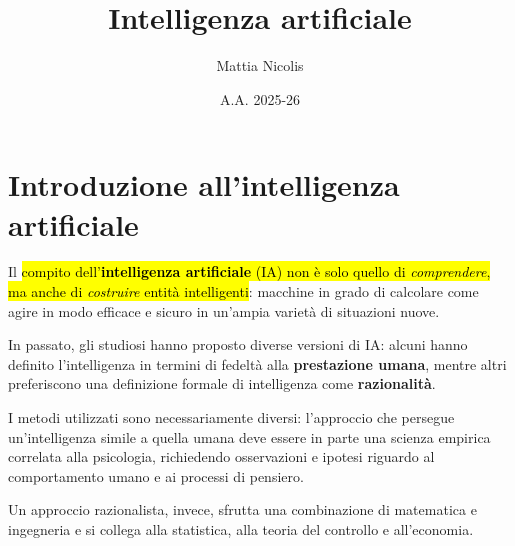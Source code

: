 \documentclass[a4paper, 12pt]{book}
\title{\textbf{Intelligenza artificiale}}
\author{Mattia Nicolis}
\date{A.A. 2025-26}
\begin{document}
    \maketitle

    \tableofcontents
    \markboth{}{}








    \chapter*{Introduzione all'intelligenza artificiale}
    Il \hl{compito dell’\textbf{intelligenza artificiale} (IA) non è solo quello di \textit{comprendere}, ma anche di \textit{costruire} entità intelligenti}: macchine in grado di calcolare come agire in modo efficace e sicuro in un’ampia varietà di situazioni nuove.

    In passato, gli studiosi hanno proposto diverse versioni di IA: alcuni hanno definito l’intelligenza in termini di fedeltà alla \textbf{prestazione umana}, mentre altri preferiscono una definizione formale di intelligenza come \textbf{razionalità}.

    I metodi utilizzati sono necessariamente diversi: l’approccio che persegue un’intelligenza simile a quella umana deve essere in parte una scienza empirica correlata alla psicologia, richiedendo osservazioni e ipotesi riguardo al comportamento umano e ai processi di pensiero.

    Un approccio razionalista, invece, sfrutta una combinazione di matematica e ingegneria e si collega alla statistica, alla teoria del controllo e all’economia.
\end{document}
